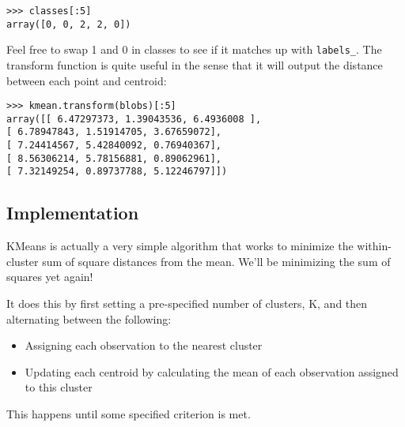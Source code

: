 \documentclass[SKL-MASTER.tex]{subfiles}
\begin{document}
\begin{framed}
\begin{verbatim}
>>> classes[:5]
array([0, 0, 2, 2, 0])
\end{verbatim}
\end{framed}

Feel free to swap 1 and 0 in classes to see if it matches up with \texttt{labels\_}.
The transform function is quite useful in the sense that it will output the distance between
each point and centroid:
\begin{framed}
\begin{verbatim}
>>> kmean.transform(blobs)[:5]
array([[ 6.47297373, 1.39043536, 6.4936008 ],
[ 6.78947843, 1.51914705, 3.67659072],
[ 7.24414567, 5.42840092, 0.76940367],
[ 8.56306214, 5.78156881, 0.89062961],
[ 7.32149254, 0.89737788, 5.12246797]])
\end{verbatim}
\end{framed}
\subsection*{Implementation}
KMeans is actually a very simple algorithm that works to minimize the within-cluster sum of
square distances from the mean. We'll be minimizing the sum of squares yet again!

It does this by first setting a pre-specified number of clusters, K, and then alternating
between the following:
\begin{itemize}
	\item Assigning each observation to the nearest cluster
	\item Updating each centroid by calculating the mean of each observation assigned
	to this cluster
\end{itemize}
This happens until some specified criterion is met.
\end{document}
